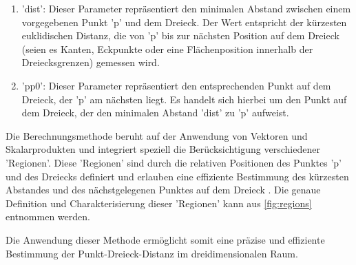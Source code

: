 \documentclass[conference]{IEEEtran}
\begin{document}
\begin{enumerate}
\item 'dist': Dieser Parameter repräsentiert den minimalen Abstand zwischen einem vorgegebenen 
Punkt 'p' und dem Dreieck. Der Wert entspricht der kürzesten euklidischen Distanz, die von 'p' bis zur 
nächsten Position auf dem Dreieck (seien es Kanten, Eckpunkte oder eine Flächenposition innerhalb der Dreiecksgrenzen) 
gemessen wird.
\item 'pp0': Dieser Parameter repräsentiert den entsprechenden Punkt auf dem Dreieck, der 'p' am nächsten liegt. Es handelt sich hierbei um den Punkt auf dem Dreieck, der den minimalen Abstand 'dist' zu 'p' aufweist.
\end{enumerate}

Die Berechnungsmethode beruht auf der Anwendung von Vektoren und Skalarprodukten und integriert 
speziell die Berücksichtigung verschiedener 'Regionen'. Diese 'Regionen' sind durch die relativen 
Positionen des Punktes 'p' und des Dreiecks definiert und erlauben eine effiziente Bestimmung des 
kürzesten Abstandes und des nächstgelegenen Punktes auf dem Dreieck \autocite{eberlyDistancePointTriangle}. 
Die genaue Definition und 
Charakterisierung dieser 'Regionen' kann aus \ref{fig:regions} entnommen werden.

Die Anwendung dieser Methode ermöglicht somit eine präzise und effiziente Bestimmung der 
Punkt-Dreieck-Distanz im dreidimensionalen Raum.
\end{document}
